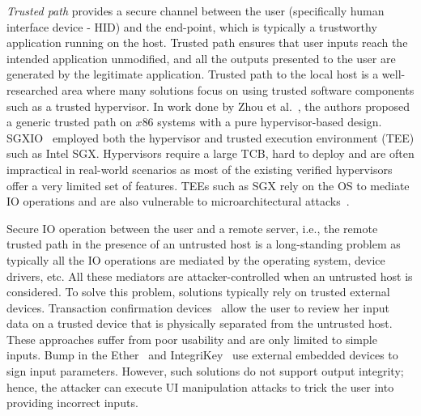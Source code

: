 \emph{Trusted path} provides a secure channel between the user (specifically human interface device - HID) and the end-point, which is typically a trustworthy application running on the host. Trusted path ensures that user inputs reach the intended application unmodified, and all the outputs presented to the user are generated by the legitimate application. Trusted path to the local host is a well-researched area where many solutions focus on using trusted software components such as a trusted hypervisor. In work done by Zhou et al.~\cite{zhou2012building}, the authors proposed a generic trusted path on $x86$ systems with a pure hypervisor-based design. SGXIO~\cite{weiser2017sgxio} employed both the hypervisor and trusted execution environment (TEE) such as Intel SGX. Hypervisors require a large TCB, hard to deploy and are often impractical in real-world scenarios as most of the existing verified hypervisors offer a very limited set of features. TEEs such as SGX rely on the OS to mediate IO operations and are also vulnerable to microarchitectural attacks~\cite{van2018foreshadow}.

Secure IO operation between the user and a remote server, i.e., the remote trusted path in the presence of an untrusted host is a long-standing problem as typically all the IO operations are mediated by the operating system, device drivers, etc. All these mediators are attacker-controlled when an untrusted host is considered. To solve this problem, solutions typically rely on trusted external devices. Transaction confirmation devices~\cite{filyanov2011uni,weigold2011secure} allow the user to review her input data on a trusted device that is physically separated from the untrusted host. These approaches suffer from poor usability and are only limited to simple inputs. Bump in the Ether~\cite{McCPerRei2006} and IntegriKey~\cite{IntegriKey} use external embedded devices to sign input parameters. However, such solutions do not support output integrity; hence, the attacker can execute UI manipulation attacks to trick the user into providing incorrect inputs.



